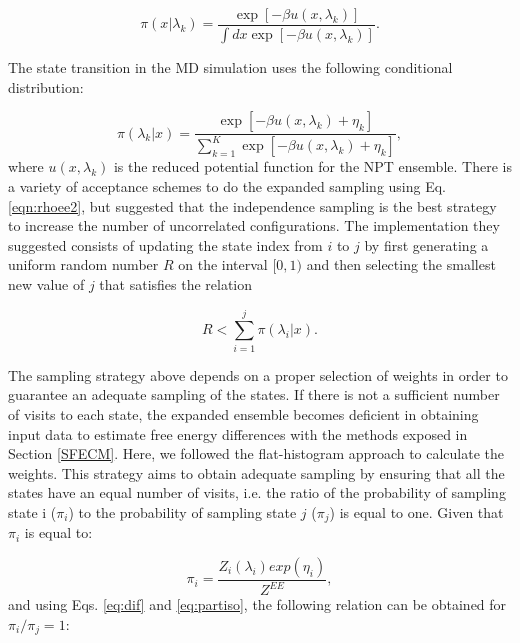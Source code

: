 \begin{equation}
\pi(x|\lambda_{k}) = \dfrac{\exp[-\beta u(x,\lambda_{k})]}{\int dx \exp [- \beta u(x,\lambda_{k})]}.
\label{eqn:rhoee1}
\end{equation} 

The state transition in the MD simulation uses the following conditional distribution:

\begin{equation}
\pi(\lambda_{k}|x) = \dfrac{\exp[-\beta u(x,\lambda_{k}) + \eta_{k}]}{ \sum_{k=1}^{K} \exp [- \beta u(x,\lambda_{k})+ \eta_{k}]},
\label{eqn:rhoee2}
\end{equation} 
where $u(x,\lambda_{k})$ is the reduced potential function for the NPT ensemble. There is a variety of acceptance schemes to do the expanded sampling using Eq. \eqref{eqn:rhoee2}, but  suggested that the independence sampling \cite{liu2002} is the best strategy to increase the number of uncorrelated configurations. The implementation they suggested consists of updating the state index from $i$ to $j$ by first generating a uniform random number $R$ on the interval $[0,1)$ and then selecting the smallest new value of $j$ that satisfies  the relation

\begin{equation}
R < \sum_{i=1}^{j} \pi(\lambda_{i}|x) .
\label{eqn:relee2}
\end{equation} 

The sampling strategy above depends on a proper selection of weights in order to guarantee an adequate sampling of the states. If there is not a sufficient number of visits to each state, the expanded ensemble becomes deficient in obtaining input data to estimate free energy differences with the methods exposed in Section \ref{SFECM}. Here, we followed the flat-histogram approach \cite{bernd1992,bernd1993,dayal2004} to calculate the weights. This strategy aims to obtain adequate sampling by ensuring that all the states have an equal number of visits, i.e. the ratio of the probability of sampling state i ($\pi_{i}$) to the probability of sampling state $j$ ($\pi_{j}$) is equal to one. Given that $\pi_{i}$ is equal to:

\begin{equation}
\pi_{i} = \dfrac{Z_{i}(\lambda_{i}) exp(\eta_{i})}{Z^{EE}} ,
\label{eqn:wei1}
\end{equation} 
and using Eqs. \ref{eq:dif} and \ref {eq:partiso}, the following relation can be obtained for $\pi_{i}/\pi_{j}=1$:

